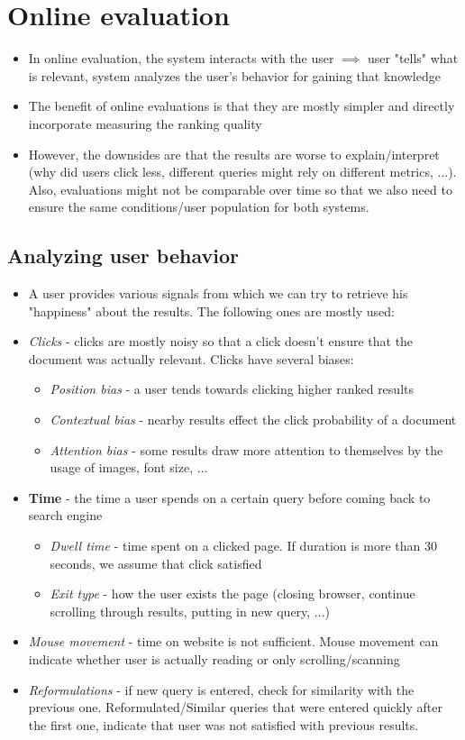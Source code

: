 \section{Online evaluation}
\begin{itemize}
	\item In online evaluation, the system interacts with the user $\implies$ user "tells" what is relevant, system analyzes the user's behavior for gaining that knowledge
	\item The benefit of online evaluations is that they are mostly simpler and directly incorporate measuring the ranking quality
	\item However, the downsides are that the results are worse to explain/interpret (why did users click less, different queries might rely on different metrics, ...). Also, evaluations might not be comparable over time so that we also need to ensure the same conditions/user population for both systems.
\end{itemize}
\subsection{Analyzing user behavior}
\begin{itemize}
	\item A user provides various signals from which we can try to retrieve his "happiness" about the results. The following ones are mostly used:
	\item \textit{Clicks} - clicks are mostly noisy so that a click doesn't ensure that the document was actually relevant. Clicks have several biases:
	\begin{itemize}
		\item \textit{Position bias} - a user tends towards clicking higher ranked results
		\item \textit{Contextual bias} - nearby results effect the click probability of a document
		\item \textit{Attention bias} - some results draw more attention to themselves by the usage of images, font size, ...
	\end{itemize}
	\item \textbf{Time} - the time a user spends on a certain query before coming back to search engine
	\begin{itemize}
		\item \textit{Dwell time} - time spent on a clicked page. If duration is more than 30 seconds, we assume that click satisfied
		\item \textit{Exit type} - how the user exists the page (closing browser, continue scrolling through results, putting in new query, ...) 
	\end{itemize}
	\item \textit{Mouse movement} - time on website is not sufficient. Mouse movement can indicate whether user is actually reading or only scrolling/scanning
	\item \textit{Reformulations} - if new query is entered, check for similarity with the previous one. Reformulated/Similar queries that were entered quickly after the first one, indicate that user was not satisfied with previous results.
\end{itemize}
